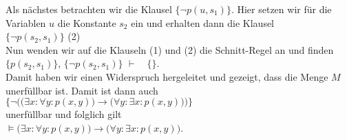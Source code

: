 Als n\"{a}chstes betrachten wir die Klausel $\big\{\neg p(u,s_1)\big\}$.
Hier setzen wir f\"{u}r die Variablen $u$ die Konstante $s_2$ ein und erhalten dann die
Klausel \\[0.2cm]
\hspace*{1.3cm} $\big\{\neg p(s_2,s_1)\big\}$ \hspace*{\fill} (2) \\[0.2cm]
Nun wenden wir auf die Klauseln (1) und (2) die Schnitt-Regel an und finden \\[0.2cm]
\hspace*{1.3cm} 
$\big\{ p(s_2,s_1) \big\}$, \quad$\big\{\neg p(s_2,s_1)\big\}$ \quad $\vdash \quad \{\}$.
\\[0.2cm]
Damit haben wir einen Widerspruch hergeleitet und gezeigt, dass die Menge $M$ unerf\"{u}llbar
ist. Damit ist dann auch \\[0.2cm]
\hspace*{1.3cm} 
$\Big\{ \neg \Big(\big(\exists x\colon \forall y\colon  p(x,y)\big) \rightarrow  \big(\forall y\colon \exists x\colon p(x,y)\big)\Big)\Big\}$
\\[0.2cm]
unerf\"{u}llbar und folglich gilt \\[0.2cm]
\hspace*{1.3cm} 
$\models \big(\exists x\colon \forall y\colon  p(x,y)\big) \rightarrow  \big(\forall y\colon \exists x\colon p(x,y)\big)$.

